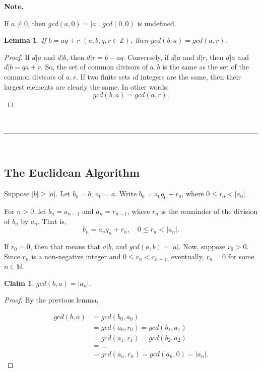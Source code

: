 \documentclass[a4paper,12pt]{report}
\newcommand{\abs}[1]{\left|#1\right|}
\newcommand{\class}[2]{#2}
\newcounter{statement}
\numberwithin{statement}{chapter}
\newtheorem{lemma}[statement]{Lemma}
\newtheorem{claim}[statement]{Claim}
\numberwithin{equation}{chapter}
\numberwithin{section}{chapter}
\numberwithin{subsection}{section}
\begin{document}
 {\bf Note.} 

If $a \neq 0$, then $gcd(a, 0) = \abs{a}$.
$gcd(0, 0)$ is undefined.




\begin{lemma}

If $b = aq + r$ $(a, b, q, r \in \mathbb{Z})$, then
$gcd(b, a) = gcd (a, r)$.
\end{lemma}
\begin{proof}

If $d | a$ and $d | b$, then $d | r = b - aq$.
Conversely, if $d | a$ and $d | r$, then $d|a$ and $d|b = qa+r$.
So, the set of common divisors of $a, b$ is the same as the set of the common divisors of $a, r$.
If two finite sets of integers are the same, then their largest elements are clearly the same.
In other words:
\[
gcd(b, a) = gcd(a, r).
\]


\end{proof}




\quad\\\hrule
\quad\\
\subsection*{The Euclidean Algorithm}


Suppose $\abs{b} \geq \abs{a}$.  Let $b_0 = b$, $a_0 = a$.
Write $b_0 = a_0q_0 + r_0$, where $0 \leq r_0 < \abs{a_0}$.


For $n > 0$, let $b_n = a_{n - 1}$ and $a_n = r_{n - 1}$, where
$r_n$ is the remainder of the division of $b_n$ by $a_n$.  That is,
\[
b_n = a_nq_n + r_n, \quad  0 \leq r_n < \abs{a_n}.
\]

If $r_0 = 0$, then that means that $a | b$, and $gcd(a, b) = \abs{a}$.
Now, suppose $r_0 > 0$.
Since $r_n$ is a non-negative integer and  $0 \leq r_n < r_{n - 1}$,
eventually, $r_n = 0$ for some $n \in \mathbb{N}$.




\begin{claim}

$gcd(b, a) = \abs{a_n}$.

\end{claim}
\begin{proof}

By the previous lemma,

\[
\begin{split}
gcd(b, a) &= gcd(b_0, a_0)\\
 &
\class{steps5 steps}{= gcd(a_0, r_0) = gcd(b_1, a_1)}
\\
&
\class{steps5 steps}{= gcd(a_1, r_1) = gcd(b_2, a_2)}
\\
&
\class{steps5 steps}{= \ldots}
\\
&
\class{steps5 steps}{
= gcd(a_{n}, r_{n}) = gcd(a_n, 0) = \abs{a_n}.
}
\end{split}
\]



\end{proof}
\end{document}
